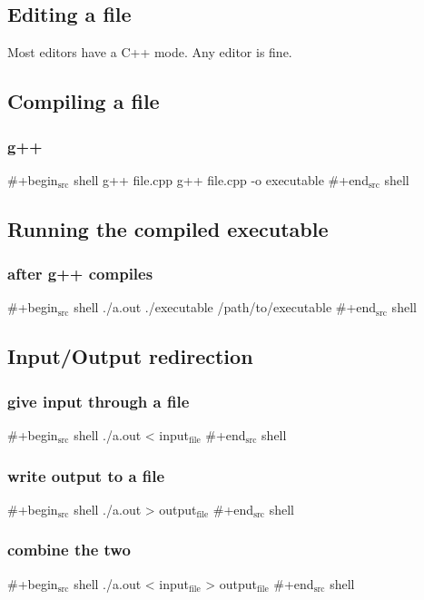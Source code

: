 \documentclass[11pt]{article}
\begin{document}
\subsection{Editing a file}
\label{sec:orgheadline37}

Most editors have a C++ mode. Any editor is fine.


\subsection{Compiling a file}
\label{sec:orgheadline39}

\subsubsection{g++}
\label{sec:orgheadline38}
\#+begin\(_{\text{src}}\) shell
g++ file.cpp
g++ file.cpp -o executable
\#+end\(_{\text{src}}\) shell


\subsection{Running the compiled executable}
\label{sec:orgheadline41}

\subsubsection{after g++ compiles}
\label{sec:orgheadline40}
\#+begin\(_{\text{src}}\) shell
./a.out
./executable
/path/to/executable
\#+end\(_{\text{src}}\) shell


\subsection{Input/Output redirection}
\label{sec:orgheadline45}

\subsubsection{give input through a file}
\label{sec:orgheadline42}
\#+begin\(_{\text{src}}\) shell
./a.out < input\(_{\text{file}}\)
\#+end\(_{\text{src}}\) shell

\subsubsection{write output to a file}
\label{sec:orgheadline43}
\#+begin\(_{\text{src}}\) shell
./a.out > output\(_{\text{file}}\)
\#+end\(_{\text{src}}\) shell

\subsubsection{combine the two}
\label{sec:orgheadline44}
\#+begin\(_{\text{src}}\) shell
./a.out < input\(_{\text{file}}\) > output\(_{\text{file}}\)
\#+end\(_{\text{src}}\) shell
\end{document}
